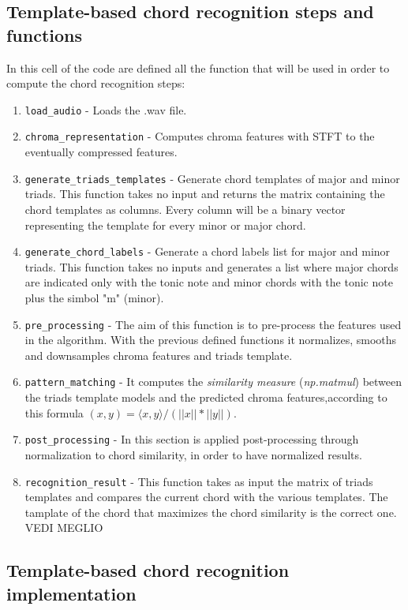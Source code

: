 \documentclass{article}
\begin{document}
\subsection*{Template-based chord recognition steps and functions}

In this cell of the code are defined all the function that will be used in order to compute the chord recognition steps:

\begin{enumerate}
	\item \verb|load_audio| - Loads the .wav file.
	\item \verb|chroma_representation| - Computes chroma features with STFT to the eventually compressed features.
	\item \verb|generate_triads_templates| - Generate chord templates of major and minor triads. This function takes no input and returns the matrix containing the chord templates as columns. Every column will be a binary vector representing the template for every minor or major chord.
	\item \verb|generate_chord_labels| - Generate a chord labels list for major and minor triads.
This function takes no inputs and generates a list where major chords are indicated only with the tonic note and minor chords with the tonic note plus the simbol "m" (minor).
	\item \verb|pre_processing| - The aim of this function is to pre-process the features used in the algorithm. With the previous defined functions it normalizes, smooths and downsamples chroma features and triads template.
	\item \verb|pattern_matching| - It computes the \textit{similarity measure} (\textit{np.matmul}) between the triads template models and the predicted chroma features,according to this formula $(x,y)=\langle x,y\rangle/(||x||*||y||)$.
	\item \verb|post_processing| - In this section is applied post-processing through normalization to chord similarity, in order to have normalized results.
	\item \verb|recognition_result| - This function takes as input the matrix of triads templates and compares the current chord with the various templates. The tamplate of the chord that maximizes the chord similarity is the correct one. \color{red}VEDI MEGLIO\color{black}
\end{enumerate}

\subsection*{Template-based chord recognition implementation}
\end{document}
